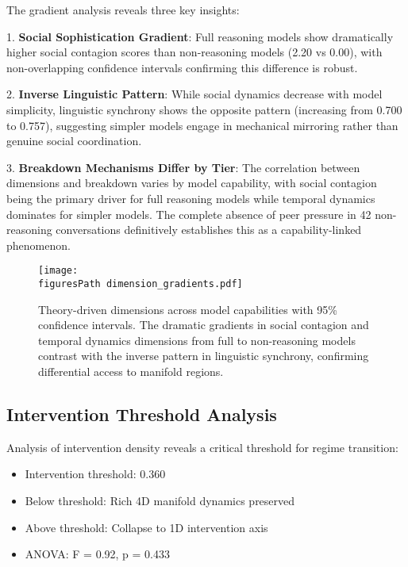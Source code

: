 \documentclass[11pt,letterpaper]{article}
\newcommand{\nonReasoningCount}{42}
\newcommand{\interventionThreshold}{0.360}
\newcommand{\interventionThresholdPValue}{0.433}
\newcommand{\socialContagionFullMean}{2.20}
\newcommand{\socialContagionNoMean}{0.00}
\newcommand{\fullLinguisticAlignment}{0.700}
\newcommand{\nonLinguisticAlignment}{0.757}
\newcommand{\figuresPath}{../analysis/rigorous_analysis_outputs/figures/}
\begin{document}
The gradient analysis reveals three key insights:

1. \textbf{Social Sophistication Gradient}: Full reasoning models show dramatically higher social contagion scores than non-reasoning models (\socialContagionFullMean{} vs \socialContagionNoMean{}), with non-overlapping confidence intervals confirming this difference is robust.

2. \textbf{Inverse Linguistic Pattern}: While social dynamics decrease with model simplicity, linguistic synchrony shows the opposite pattern (increasing from \fullLinguisticAlignment{} to \nonLinguisticAlignment{}), suggesting simpler models engage in mechanical mirroring rather than genuine social coordination.

3. \textbf{Breakdown Mechanisms Differ by Tier}: The correlation between dimensions and breakdown varies by model capability, with social contagion being the primary driver for full reasoning models while temporal dynamics dominates for simpler models. The complete absence of peer pressure in \nonReasoningCount{} non-reasoning conversations definitively establishes this as a capability-linked phenomenon.

\begin{figure}[htbp]
\centering
\texttt{[image: \\figuresPath dimension\_gradients.pdf]}
\caption{Theory-driven dimensions across model capabilities with 95\% confidence intervals. The dramatic gradients in social contagion and temporal dynamics dimensions from full to non-reasoning models contrast with the inverse pattern in linguistic synchrony, confirming differential access to manifold regions.}
\label{fig:dimension_gradients}
\end{figure}

\subsection{Intervention Threshold Analysis}

Analysis of intervention density reveals a critical threshold for regime transition:

\begin{itemize}
    \item Intervention threshold: \interventionThreshold{}
    \item Below threshold: Rich 4D manifold dynamics preserved
    \item Above threshold: Collapse to 1D intervention axis
    \item ANOVA: F = 0.92, p = \interventionThresholdPValue{}
\end{itemize}
\end{document}
